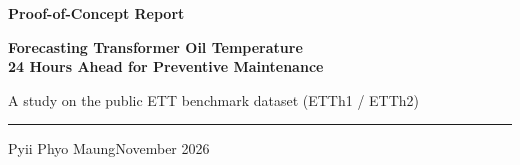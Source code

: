 \documentclass[aspectratio=169,10pt]{beamer}
\begin{document}
{
\begin{frame}[plain]
  \vspace{1.2cm}
  {\color{accent}\small\bfseries Proof-of-Concept Report}\par\vspace{0.3cm}
  {\color{ink}\LARGE\bfseries Forecasting Transformer Oil Temperature\\[0.15cm]24 Hours Ahead for Preventive Maintenance}\par\vspace{0.4cm}
  {\color{muted}\normalsize A study on the public ETT benchmark dataset (ETTh1 / ETTh2)}\par
  \vfill
  {\color{rule}\rule{\textwidth}{0.8pt}}\par\vspace{0.15cm}
  {\small Pyii Phyo Maung}\hfill{\small\color{muted}November 2026}
  \vspace{0.6cm}
\end{frame}}
\end{document}
